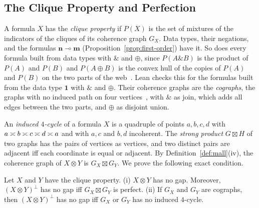 \subsection{The Clique Property and Perfection}
\label{sec:exact-perfect}

A formula $X$ has the \emph{clique property} if $P(X)$ is the set of
mixtures of the indicators of the cliques of its coherence graph $G_X$.
Data types, their negations, and the formulas $\mathbf{n} \multimap
\mathbf{m}$ (Proposition~\ref{prop:first-order}) have it. So does every
formula built from data types with $\mathbin{\&}$ and $\oplus$, since
$P(A \mathbin{\&} B)$ is the product of $P(A)$ and $P(B)$ and
$P(A \oplus B)$ is the convex hull of the copies of $P(A)$ and $P(B)$ on
the two parts of the web~\cite{danos-ehrhard2011}. Lean checks this for the
formulas built from the data type $\mathbf{1}$ with $\mathbin{\&}$ and
$\oplus$. Their coherence graphs are the
\emph{cographs}, the graphs with no induced path on four
vertices~\cite{corneil1981}, with $\mathbin{\&}$ as join, which adds all
edges between the two parts, and $\oplus$ as disjoint union.

An \emph{induced $4$-cycle} of a formula $X$ is a quadruple of points
$a, b, c, d$ with $a \mathrel{\asymp} b \mathrel{\asymp} c \mathrel{\asymp} d \mathrel{\asymp} a$ and with $a, c$ and
$b, d$ incoherent. The \emph{strong product} $G \boxtimes H$ of two
graphs has the pairs of vertices as vertices, and two distinct pairs are
adjacent iff each coordinate is equal or adjacent. By
Definition~\ref{def:mall}(iv), the coherence graph of $X \otimes Y$ is
$G_X \boxtimes G_Y$. We prove the following exact condition.

\begin{theorem}
\label{thm:second-exact}
Let $X$ and $Y$ have the clique property.
(i) $X \otimes Y$ has no gap. Moreover, $(X \otimes Y)^{\perp}$ has no gap
iff
$G_X \boxtimes G_Y$ is perfect.
(ii) If $G_X$ and $G_Y$ are cographs, then $(X \otimes Y)^{\perp}$ has no
gap iff $G_X$ or $G_Y$ has no induced $4$-cycle.
\end{theorem}

